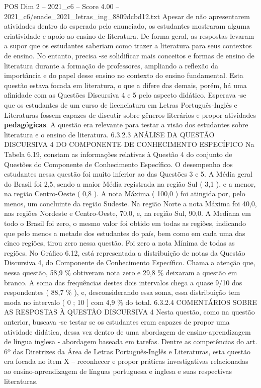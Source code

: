 \begin{textsample}{POS Dim 2 – 2021\_c6 – Score 4.00 – 2021\_c6/enade\_2021\_letras\_ing\_8809dcbd12.txt}
Apesar de não apresentarem atividades dentro do esperado pelo enunciado, os estudantes mostraram alguma criatividade e apoio ao ensino de literatura.
De forma geral, as respostas levaram a supor que os estudantes saberiam como trazer a literatura para seus contextos de ensino.
No entanto, precisa -se solidificar mais conceitos e formas de ensino de literatura durante a formação de professores, ampliando a reflexão da importância e do papel desse ensino no contexto do ensino fundamental.
Esta questão estava focada em literatura, o que a difere das demais, porém, há uma afinidade com as Questões Discursiva 4 e 5 pelo aspecto didático.
Esperava -se que os estudantes de um curso de licenciatura em Letras Português-Inglês e Literaturas fossem capazes de discutir sobre gêneros literários e propor atividades \textbf{pedagógicas}.
A questão era relevante para testar a visão dos estudantes sobre literatura e o ensino de literatura. 6.3.2.3 ANÁLISE DA QUESTÃO DISCURSIVA 4 DO COMPONENTE DE CONHECIMENTO ESPECÍFICO Na Tabela 6.19, constam as informações relativas à Questão 4 do conjunto de Questões do Componente de Conhecimento Específico.
O desempenho dos estudantes nessa questão foi muito inferior ao das Questões 3 e 5.
A Média geral do Brasil foi 2,5, sendo a maior Média registrada na região Sul ( 3,1 ), e a menor, na região Centro-Oeste ( 0,8 ).
A nota Máxima ( 100,0 ) foi atingida por, pelo menos, um concluinte da região Sudeste.
Na região Norte a nota Máxima foi 40,0, nas regiões Nordeste e Centro-Oeste, 70,0, e, na região Sul, 90,0.
A Mediana em todo o Brasil foi zero, o mesmo valor foi obtido em todas as regiões, indicando que pelo menos a metade dos estudantes do país, bem como em cada uma das cinco regiões, tirou zero nessa questão.
Foi zero a nota Mínima de todas as regiões.
No Gráfico 6.12, está representada a distribuição de notas da Questão Discursiva 4, do Componente de Conhecimento Específico.
Chama a atenção que, nessa questão, 58,9 \% obtiveram nota zero e 29,8 \% deixaram a questão em branco.
A soma das frequências destes dois intervalos chega a quase 9/10 dos respondentes ( 88,7 \% ), e, desconsiderando essa soma, essa distribuição tem moda no intervalo ( 0 ; 10 ] com 4,9 \% do total. 6.3.2.4 COMENTÁRIOS SOBRE AS RESPOSTAS À QUESTÃO DISCURSIVA 4 Nesta questão, como na questão anterior, buscava -se testar se os estudantes eram capazes de propor uma atividade didática, dessa vez dentro de uma abordagem de ensino-aprendizagem de língua inglesa - abordagem baseada em tarefas.
Dentre as competências do art. 6º das Diretrizes da Área de Letras Português-Inglês e Literaturas, esta questão era focada no item X – reconhecer e propor práticas investigativas relacionadas ao ensino-aprendizagem de línguas portuguesa e inglesa e suas respectivas literaturas.

\end{textsample}
